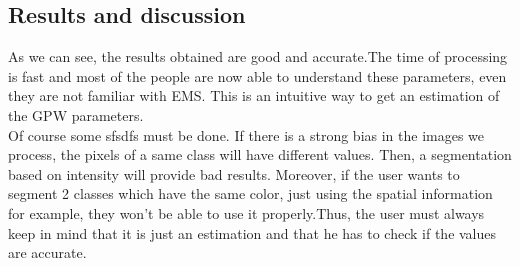 \subsection{Results and discussion}
As we can see, the results obtained are good and accurate.The time of processing is fast and most of the people are now able to understand these parameters, even they are not familiar with EMS. This is an intuitive way to get an estimation of the GPW parameters.\\
Of course some sfsdfs must be done.
If there is a strong bias in the images we process, the pixels of a same class will have different values. Then, a segmentation based on intensity will provide bad results. Moreover, if the user wants to segment 2 classes which have the same color, just using the spatial information for example, they won't be able to use it properly.Thus, the user must always keep in mind that it is just an estimation and that he has to check if the values are accurate.

